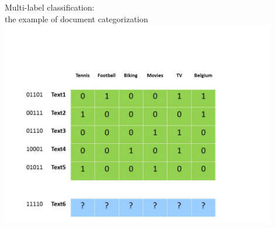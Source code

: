 \documentclass[]{beamer}
\begin{document}
\begin{frame}{Multi-label classification: \\
the example of document categorization}
\includegraphics[width=0.9\textwidth,trim = 0 0 100 100,clip]{Figures/pictures/Slide2}
\end{frame}

\begin{frame}[plain]
     \end{frame}
\end{document}
